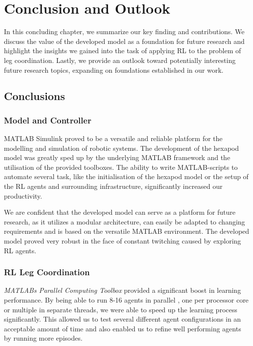 \chapter{Conclusion and Outlook}
\label{ch:conclusion}

In this concluding chapter, we summarize our key finding and contributions.
We discuss the value of the developed model as a foundation for future research and highlight the insights we gained into the task of applying RL to the problem of leg coordination.
Lastly, we provide an outlook toward potentially interesting future research topics, expanding on foundations established in our work.

\section{Conclusions}

\subsection{Model and Controller}
MATLAB Simulink proved to be a versatile and reliable platform for the modelling and simulation of robotic systems.
The development of the hexapod model was greatly sped up by the underlying MATLAB framework and the utilisation of the provided toolboxes.
The ability to write MATLAB-scripts to automate several task, like the initialisation of the hexapod model or the setup of the RL agents and surrounding infrastructure, significantly increased our productivity.

We are confident that the developed model can serve as a platform for future research, as it utilizes a modular architecture, can easily be adapted to changing requirements and is based on the versatile MATLAB environment.
The developed model proved very robust in the face of constant twitching caused by exploring RL agents.

\subsection{RL Leg Coordination}
\textit{MATLABs Parallel Computing Toolbox} provided a significant boost in learning performance.
By being able to run 8-16 agents in parallel , one per processor core or multiple in separate threads, we were able to speed up the learning process significantly.
This allowed us to test several different agent configurations in an acceptable amount of time and also enabled us to refine well performing agents by running more episodes.

